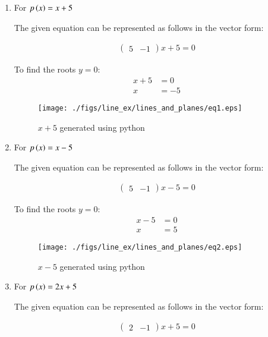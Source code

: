\renewcommand{\theequation}{\theenumi}
\begin{enumerate}

\item \solution For $p\left(x\right) = x + 5$ 
\begin{flushleft}
The given equation can be represented as follows in the vector form:
\end{flushleft}
\begin{align}
\begin{pmatrix}
5 & -1 
\end{pmatrix}
x + 5 = 0
\end{align}

To find the roots $y=0$:
\begin{align}
x + 5 &= 0 \\
x &= -5
\end{align}
\begin{figure}[!ht]
\centering
\texttt{[image: ./figs/line\_ex/lines\_and\_planes/eq1.eps]}
\caption{$x + 5$ generated using python}
\label{fig:eq1_lines_and_planes}
\end{figure} 
\pagebreak
\item \solution For $p\left(x\right) = x - 5$
\begin{flushleft}
The given equation can be represented as follows in the vector form:
\end{flushleft}
\begin{align}
\begin{pmatrix}
5 & -1 
\end{pmatrix}
x - 5 = 0
\end{align}

To find the roots $y=0$:
\begin{align}
x - 5 &= 0 \\
x &= 5
\end{align}
\begin{figure}[!ht]
\centering
\texttt{[image: ./figs/line\_ex/lines\_and\_planes/eq2.eps]}
\caption{$x - 5$ generated using python}
\label{fig:eq2_lines_and_planes}
\end{figure}
\item \solution For $p\left(x\right) = 2x + 5$
\begin{flushleft}
The given equation can be represented as follows in the vector form:
\end{flushleft}
\begin{align}
\begin{pmatrix}
2 & -1 
\end{pmatrix}
x + 5 = 0
\end{align}


\end{enumerate}
